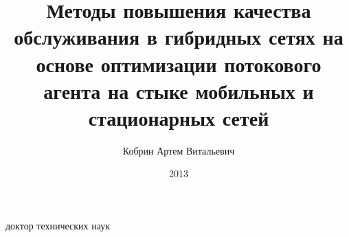 
\title{Методы повышения качества обслуживания в гибридных сетях на основе оптимизации 
потокового агента на стыке мобильных и стационарных сетей}
\author{Кобрин Артем Витальевич}
           {доктор технических наук}
\date{2013}